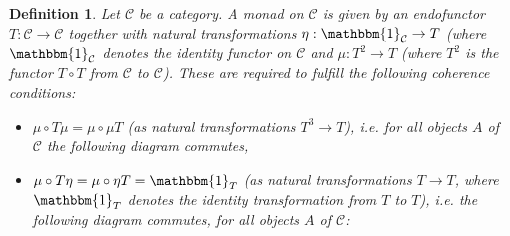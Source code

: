 \documentclass[11pt]{report}
\newcommand{\mcC}{\mathcal{C}}
\newtheorem{defn}[thm]{Definition} %
\begin{document}
\begin{defn}
  Let $\mcC$ be a category. A monad on $\mcC$ is given by an endofunctor $T: \mcC \to \mcC$ together with natural transformations $\eta: \mathbbm{1}_\mcC \to T$ (where $\mathbbm{1}_\mcC$ denotes the identity functor on $\mcC$ and
  $\mu: T^2 \to T$ (where $T^2$ is the functor $T \circ T$ from $\mcC$ to $\mcC$). These are required to fulfill the following coherence conditions:
  \begin{itemize}
  \item $\mu \circ T \mu = \mu \circ \mu T$ (as natural transformations $T^3 \to T$), i.e. for all objects $A$ of $\mcC$ the following diagram commutes,
    \begin{center}
    \end{center} 
  \item $\mu \circ T \eta = \mu \circ \eta T = \mathbbm{1}_T $ (as natural transformations  $T \to T$, where $\mathbbm{1}_T$ denotes the identity transformation from $T$ to $T$), i.e.
    the following diagram commutes, for all objects $A$ of $\mcC$:
    \begin{center}
    \end{center} 

  \end{itemize}
\end{defn}
\end{document}
